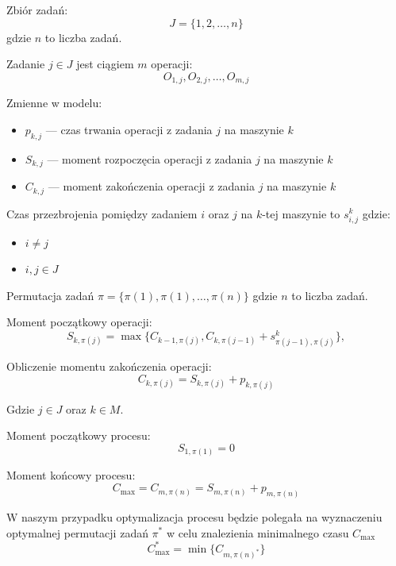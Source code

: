 Zbiór zadań:
\begin{equation}
	J=\lbrace 1,2,\dots,n \rbrace
\end{equation}
gdzie $n$ to liczba zadań.


Zadanie $j \in J$ jest ciągiem $m$ operacji:
\begin{equation}
	O_{1,j},O_{2,j},\dots,O_{m,j}
\end{equation}

Zmienne w modelu:
\begin{itemize}
	\item $p_{k,j}$ --- czas trwania operacji z zadania $j$ na maszynie $k$
	\item $S_{k,j}$ --- moment rozpoczęcia operacji z zadania $j$ na maszynie $k$
	\item $C_{k,j}$ --- moment zakończenia operacji z zadania $j$ na maszynie $k$
\end{itemize}

Czas przezbrojenia pomiędzy zadaniem $i$ oraz $j$ na $k$-tej maszynie to $s_{i,j}^{k}$ gdzie:
\begin{itemize}
	\item $i \neq j$
	\item  $i,j \in J$
\end{itemize}

Permutacja zadań $\pi = \lbrace \pi(1),\pi(1),\dots,\pi(n) \rbrace$ gdzie $n$ to liczba zadań.

Moment początkowy operacji:
\begin{equation}
	S_{k,\pi(j)}=\max\{C_{k-1,\pi(j)},C_{k,\pi(j-1)}+s^k_{\pi(j-1),\pi(j)}\},
\end{equation}

Obliczenie momentu zakończenia operacji:
\begin{equation}
	C_{k,\pi(j)} = S_{k,\pi(j)} + p_{k,\pi(j)}
\end{equation}

Gdzie $ j \in J$ oraz $k \in M$.

Moment początkowy procesu:
\begin{equation}
	S_{1,\pi(1)}=0
\end{equation}

Moment końcowy procesu:
\begin{equation}
	C_{\max} = 	C_{m,\pi(n)} = S_{m,\pi(n)} + p_{m,\pi(n)}
\end{equation}

W naszym przypadku optymalizacja procesu będzie polegała na wyznaczeniu optymalnej permutacji zadań $\pi^*$
w celu znalezienia minimalnego czasu $C_{\max}$
\begin{equation}
	C_{\max}^{*} = \min\{C_{m,\pi{(n)}^{*}}\}
\end{equation}

